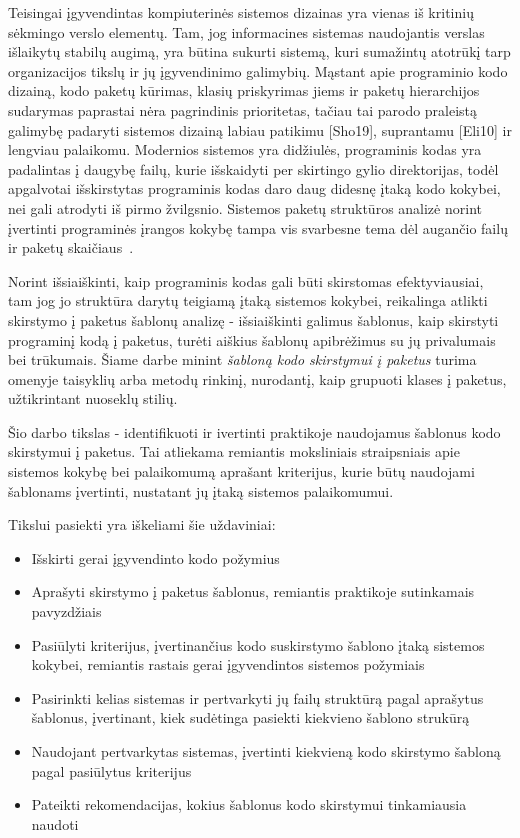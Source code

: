 Teisingai įgyvendintas kompiuterinės sistemos dizainas yra vienas iš kritinių sėkmingo verslo
elementų.
Tam, jog informacines sistemas naudojantis verslas išlaikytų stabilų augimą, yra būtina sukurti sistemą, kuri sumažintų
atotrūkį tarp organizacijos tikslų ir jų įgyvendinimo galimybių.
Mąstant apie programinio kodo
dizainą, kodo paketų kūrimas, klasių priskyrimas jiems ir paketų hierarchijos sudarymas paprastai
nėra pagrindinis prioritetas, tačiau tai parodo praleistą galimybę padaryti sistemos dizainą labiau
patikimu [Sho19], suprantamu [Eli10] ir lengviau palaikomu.
Modernios sistemos yra didžiulės, programinis kodas yra padalintas į daugybę failų,
kurie išskaidyti per skirtingo gylio direktorijas, todėl apgalvotai išskirstytas programinis
kodas daro daug didesnę įtaką kodo kokybei, nei gali atrodyti iš pirmo žvilgsnio.
Sistemos paketų struktūros analizė norint įvertinti programinės įrangos kokybę
tampa vis svarbesne tema dėl augančio failų ir paketų skaičiaus~\cite{DesignMetrics}.

Norint išsiaiškinti, kaip programinis kodas gali būti skirstomas efektyviausiai,
tam jog jo struktūra darytų teigiamą įtaką sistemos kokybei, reikalinga atlikti skirstymo į paketus šablonų analizę -
išsiaiškinti galimus šablonus, kaip skirstyti programinį kodą į paketus, turėti aiškius šablonų apibrėžimus su jų
privalumais bei trūkumais.
Šiame darbe minint \textit{šabloną kodo skirstymui į paketus} turima omenyje taisyklių arba metodų rinkinį,
nurodantį, kaip grupuoti klases į paketus, užtikrintant nuoseklų stilių.

Šio darbo tikslas - identifikuoti ir ivertinti praktikoje naudojamus šablonus kodo skirstymui į paketus.
Tai atliekama remiantis moksliniais straipsniais apie sistemos kokybę bei palaikomumą aprašant kriterijus,
kurie būtų naudojami šablonams įvertinti, nustatant jų įtaką sistemos palaikomumui.

Tikslui pasiekti yra iškeliami šie uždaviniai:
\begin{itemize}
    \item  Išskirti gerai įgyvendinto kodo požymius
    \item  Aprašyti skirstymo į paketus šablonus, remiantis praktikoje sutinkamais pavyzdžiais
    \item  Pasiūlyti kriterijus, įvertinančius kodo suskirstymo šablono įtaką sistemos kokybei, remiantis
rastais gerai įgyvendintos sistemos požymiais
    \item  Pasirinkti kelias sistemas ir pertvarkyti jų failų struktūrą pagal aprašytus šablonus, įvertinant,
kiek sudėtinga pasiekti kiekvieno šablono strukūrą
    \item  Naudojant pertvarkytas sistemas, įvertinti kiekvieną kodo skirstymo šabloną pagal pasiūlytus kriterijus
    \item  Pateikti rekomendacijas, kokius šablonus kodo skirstymui tinkamiausia naudoti
\end{itemize}

